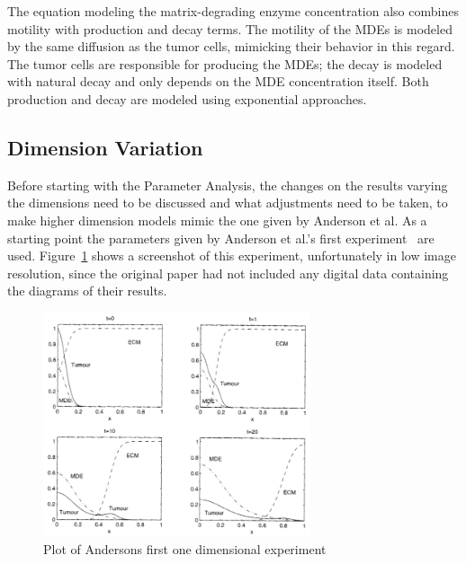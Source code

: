 The equation modeling the matrix-degrading enzyme concentration also combines motility with production and decay terms. The motility of the MDEs is modeled by the same diffusion as the tumor cells, mimicking their behavior in this regard. The tumor cells are responsible for producing the MDEs; the decay is modeled with natural decay and only depends on the MDE concentration itself. Both production and decay are modeled using exponential approaches.


\subsection{Dimension Variation}

Before starting with the Parameter Analysis, the changes on the results varying the dimensions need to be discussed and what adjustments need to be taken, to make higher dimension models mimic the one given by Anderson et al. As a starting point the parameters given by Anderson et al.'s first experiment~\cite{anderson_mathematical_2000} are used. Figure~\ref{fig:anderson_experiment} shows a screenshot of this experiment, unfortunately in low image resolution, since the original paper had not included any digital data containing the diagrams of their results.
\begin{figure}[ht!]
 \centering
 \includegraphics[width=0.7\textwidth]{resources/images/anderson_experiment.png}
 \caption{Plot of Andersons first one dimensional experiment}
 \label{fig:anderson_experiment}
\end{figure}
